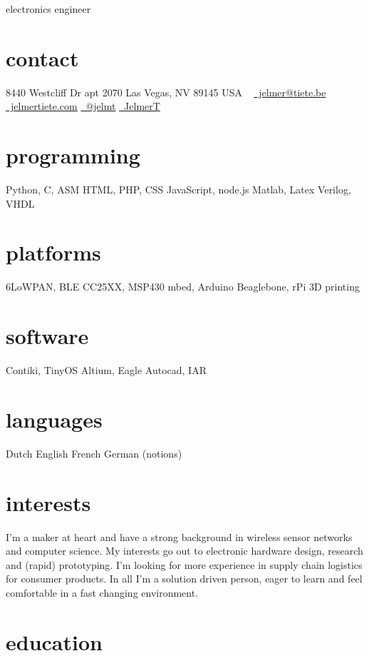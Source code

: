 \documentclass[print]{friggeri-cv}
\begin{document}
       {electronics engineer}


\begin{aside}
  \section{contact}
    8440 Westcliff Dr
    apt 2070
    Las Vegas, NV 89145
    USA
    ~
    \href{mailto:jelmer@tiete.be}{\textcolor{textcolor}{\faEnvelopeAlt}~jelmer@tiete.be}
    \href{http://jelmertiete.com}{\textcolor{textcolor}{\faGlobe}~jelmertiete.com}
    \href{http://twitter.com/jelmt}{\textcolor{textcolor}{\faTwitter}~@jelmt}
    \href{https://github.com/JelmerT}{\textcolor{textcolor}{\faGithub}~JelmerT}
  \section{programming}
    Python, C, ASM
    HTML, PHP, CSS
    JavaScript, node.js
    Matlab, Latex
    Verilog, VHDL
  \section{platforms}
    6LoWPAN, BLE
    CC25XX, MSP430
    mbed, Arduino
    Beaglebone, rPi
    3D printing
  \section{software}
    Contiki, TinyOS
    Altium, Eagle
    Autocad, IAR
  \section{languages}
    Dutch
    English
    French
    German (notions)
\end{aside}

\section{interests}
I'm a maker at heart and have a strong background in wireless sensor networks and computer science. My interests go out to electronic hardware design, research and (rapid) prototyping. I'm looking for more experience in supply chain logistics for consumer products. In all I'm a solution driven person, eager to learn and feel comfortable in a fast changing environment.

\section{education}
\end{document}
